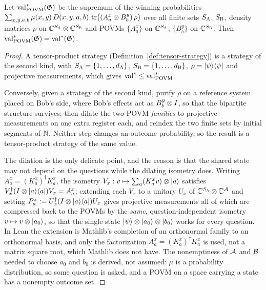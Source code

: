 \begin{lemma}
\label{lem:povm-value-eq}
\leanok
\qlib{}
Let $\mathrm{val}^*_{\mathrm{POVM}}(\mathfrak{G})$ be the supremum of the winning probabilities
$\sum_{x,y,a,b} \mu(x,y)\, D(x,y,a,b)\, \operatorname{tr}\bigl( (A^x_a \otimes B^y_b)\, \rho \bigr)$ over
all finite sets $S_{\textsc{A}}$, $S_{\textsc{B}}$, density matrices $\rho$ on $\mathbb{C}^{S_{\textsc{A}}} \otimes
\mathbb{C}^{S_{\textsc{B}}}$ and POVMs $\{A^x_a\}$ on $\mathbb{C}^{S_{\textsc{A}}}$, $\{B^y_b\}$ on $\mathbb{C}^{S_{\textsc{B}}}$.
Then $\mathrm{val}^*_{\mathrm{POVM}}(\mathfrak{G}) = \mathrm{val}^*(\mathfrak{G})$.
\end{lemma}
\begin{proof}
\leanok
A tensor-product strategy (Definition~\ref{def:tensor-strategy}) is a strategy of the
second kind, with $S_{\textsc{A}} = \{1, \ldots, d_{\textsc{A}}\}$, $S_{\textsc{B}} = \{1, \ldots,
d_{\textsc{B}}\}$, $\rho = |\psi\rangle\langle\psi|$ and projective measurements, which gives
$\mathrm{val}^* \leq \mathrm{val}^*_{\mathrm{POVM}}$.

Conversely, given a strategy of the second kind, purify $\rho$ on a reference system
placed on Bob's side, where Bob's effects act as $B^y_b \otimes I$, so that the
bipartite structure survives; then dilate the two POVM \emph{families} to projective
measurements on one extra register each, and reindex the two finite sets by initial
segments of $\mathbb{N}$. Neither step changes an outcome probability, so the result is a
tensor-product strategy of the same value.

The dilation is the only delicate point, and the reason is that the shared state may
not depend on the questions while the dilating isometry does. Writing $A^x_a =
(K^x_a)^\dagger K^x_a$, the isometry $V_x : v \mapsto \sum_a (K^x_a v) \otimes |a\rangle$
satisfies $V_x^\dagger (I \otimes |a\rangle\langle a|) V_x = A^x_a$; extending each $V_x$ to a
unitary $U_x$ of $\mathbb{C}^{S_{\textsc{A}}} \otimes \mathbb{C}^{\mathcal{A}}$ and setting $P^x_a := U_x^\dagger (I
\otimes |a\rangle\langle a|) U_x$ gives projective measurements all of which are compressed back
to the POVMs by the \emph{same}, question-independent isometry $v \mapsto v \otimes
|a_0\rangle$, so that the single state $|\psi\rangle \otimes |a_0\rangle \otimes |b_0\rangle$
works for every question. In Lean the extension is Mathlib's completion of an orthonormal
family to an orthonormal basis, and only the factorization $A^x_a = (K^x_a)^\dagger K^x_a$ is
used, not a matrix square root, which Mathlib does not have. The nonemptiness of $\mathcal{A}$
and $\mathcal{B}$ needed to choose $a_0$ and $b_0$ is derived, not assumed: $\mu$ is a
probability distribution, so some question is asked, and a POVM on a space carrying a
state has a nonempty outcome set.
\end{proof}

